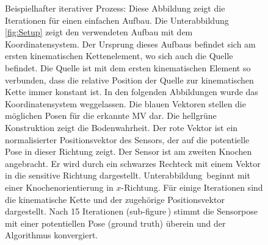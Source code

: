 \begin{figure}[h]
    \centering
    
    \label{fig:legend}
    \caption{Beispielhafter iterativer Prozess: Diese Abbildung zeigt die Iterationen für einen einfachen Aufbau. Die Unterabbildung \ref{fig:Setup} zeigt den verwendeten Aufbau mit dem Koordinatensystem. Der Ursprung dieses Aufbaus befindet sich am ersten kinematischen Kettenelement, wo sich auch die Quelle befindet. Die Quelle ist mit dem ersten kinematischen Element so verbunden, dass die relative Position der Quelle zur kinematischen Kette immer konstant ist. In den folgenden Abbildungen wurde das Koordinatensystem weggelassen. Die blauen Vektoren stellen die möglichen Posen für die erkannte MV dar. Die hellgrüne Konstruktion zeigt die Bodenwahrheit. Der rote Vektor ist ein normalisierter Positionsvektor des Sensors, der auf die potentielle Pose in dieser Richtung zeigt. Der Sensor ist am zweiten Knochen angebracht. Er wird durch ein schwarzes Rechteck mit einem Vektor in die sensitive Richtung dargestellt. Unterabbildung\, beginnt mit einer Knochenorientierung in $x$-Richtung. Für einige Iterationen sind die kinematische Kette und der zugehörige Positionsvektor dargestellt. Nach 15 Iterationen (sub-figure\,) stimmt die Sensorpose mit einer potentiellen Pose (ground truth) überein und der Algorithmus konvergiert.}
    \label{fig:Concept_Algorithm}
\end{figure}


